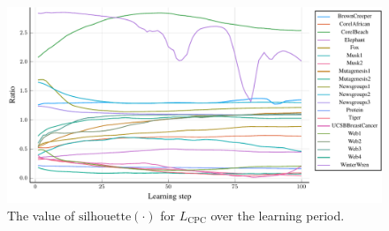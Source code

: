 \begin{figure}
  \centering
  \includegraphics[width=\textwidth]{images/CPC-toy/ratio/CPC-toy-ratio.pdf}
  \caption{The value of \( \mathrm{silhouette} \left( \cdot \right) \) for \( L_\mathrm{CPC} \) over the learning period.}\label{fig:CPC-toy-ratio}
\end{figure}

